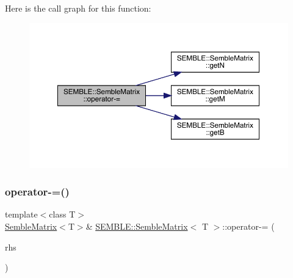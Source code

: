 Here is the call graph for this function\+:
\nopagebreak
\begin{figure}[H]
\begin{center}
\leavevmode
\includegraphics[width=350pt]{df/d87/structSEMBLE_1_1SembleMatrix_a61af6d42338efa84f4ed2456c4799445_cgraph}
\end{center}
\end{figure}
\mbox{\label{structSEMBLE_1_1SembleMatrix_a74f00dfff31b8befe21919b1147218d2}} 
\subsubsection{\texorpdfstring{operator-\/=()}{operator-=()}\hspace{0.1cm}{\footnotesize\ttfamily [2/4]}}
{\footnotesize\ttfamily template$<$class T$>$ \\
\mbox{\hyperlink{structSEMBLE_1_1SembleMatrix}{Semble\+Matrix}}$<$T$>$\& \mbox{\hyperlink{structSEMBLE_1_1SembleMatrix}{S\+E\+M\+B\+L\+E\+::\+Semble\+Matrix}}$<$ T $>$\+::operator-\/= (\begin{DoxyParamCaption}\item[{const \mbox{\hyperlink{structSEMBLE_1_1SembleMatrix}{Semble\+Matrix}}$<$ T $>$ \&}]{rhs }\end{DoxyParamCaption})}

\mbox{\label{structSEMBLE_1_1SembleMatrix_a327dbea8055acd490fb9848a512f7581}} 
